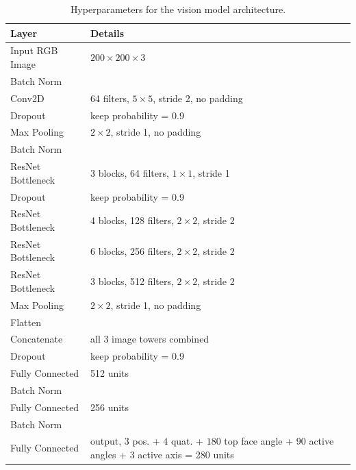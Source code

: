 \begin{table}[h!]
    \centering
    \footnotesize
    \caption{Hyperparameters for the vision model architecture.}
    \renewcommand{\arraystretch}{1.3}
    \begin{tabular}{@{}ll@{}}
        \toprule
        \textbf{Layer} & \textbf{Details} \\ \midrule
        Input RGB Image & $200\times200\times3$ \\
        Batch Norm & \\
        Conv2D & 64 filters, $5\times5$, stride 2, no padding \\
        Dropout & keep probability = 0.9 \\
        Max Pooling & $2\times2$, stride 1, no padding \\
        Batch Norm & \\
        ResNet~\citep{He2016DeepRL} Bottleneck & 3 blocks, 64 filters, $1\times1$, stride 1 \\
        Dropout & keep probability = 0.9 \\
        ResNet~\citep{He2016DeepRL} Bottleneck & 4 blocks, 128 filters, $2\times2$, stride 2 \\
        ResNet~\citep{He2016DeepRL} Bottleneck & 6 blocks, 256 filters, $2\times2$, stride 2 \\
        ResNet~\citep{He2016DeepRL} Bottleneck & 3 blocks, 512 filters, $2\times2$, stride 2 \\
        Max Pooling & $2\times2$, stride 1, no padding \\
        Flatten & \\
        Concatenate & all 3 image towers combined\\ \midrule
        Dropout & keep probability = 0.9 \\
        Fully Connected & 512 units \\
        Batch Norm & \\
        Fully Connected & 256 units \\
        Batch Norm & \\
        Fully Connected & output, $3$ pos. + $4$ quat. + $180$ top face angle + $90$ active angles + $3$ active axis = 280 units \\
    \bottomrule\end{tabular}
    \label{tbl:vision-hyper-arch}
\end{table}

